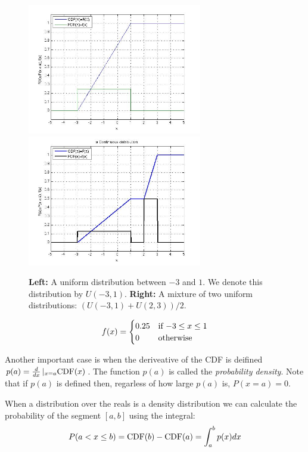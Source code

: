 \begin{figure}[t]
\begin{center}
\includegraphics[width=3in]{figs/Uniform.jpg}
\includegraphics[width=3in]{figs/unifMixture2CDF.jpg}
\end{center}
\caption{{\bf Left:} A uniform distribution between $-3$ and $1$. We
  denote this distribution by $U(-3,1)$. {\bf Right:} A mixture of two
  uniform distributions: $(U(-3,1)+U(2,3))/2$.}
\end{figure}

\[
f(x) = \begin{cases}
0.25 & \mbox{if $ -3 \leq x \leq 1$} \\
0 & \mbox{otherwise}
\end{cases}
\]

Another important case is when the deriveative of the CDF is deifined
$p(a) = \frac{d}{dx}\left|_{x=a} \mbox{CDF}(x)\right.$. The function $p(a)$
is called the {\em probability density}. Note that if $p(a)$ is
defined then, regarless of how large $p(a)$ is, $P(x=a)=0$.

When a distribution over the reals is a density distribution we can
calculate the probability of the segment $[a,b]$ using the integral:
\[
P(a < x \leq b)=\mbox{CDF}(b)-\mbox{CDF}(a)=\int_a^b p(x) dx
\]

